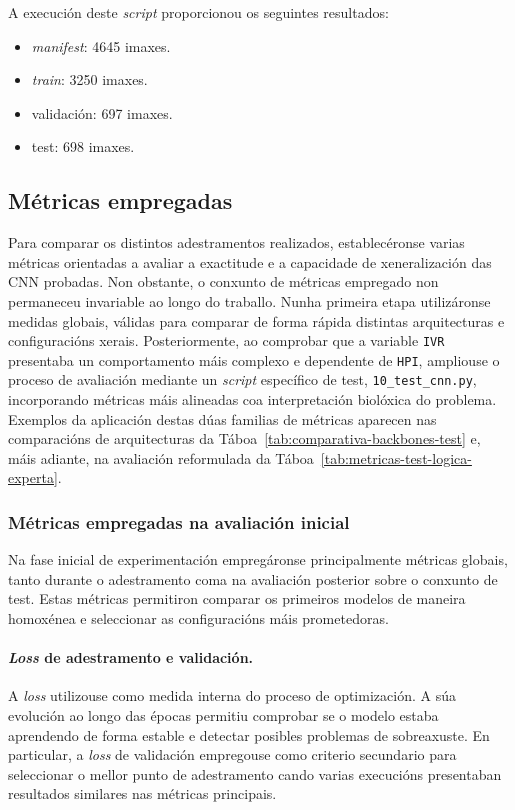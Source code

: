 A execución deste \textit{script} proporcionou os seguintes resultados:
\begin{itemize}
    \item \textit{manifest}: 4645 imaxes.
    \item \textit{train}: 3250 imaxes.
    \item validación: 697 imaxes.
    \item test: 698 imaxes.
\end{itemize}

\subsection{Métricas empregadas}
Para comparar os distintos adestramentos realizados, establecéronse varias métricas orientadas a
avaliar a exactitude e a capacidade de xeneralización das CNN probadas. Non obstante, o conxunto de
métricas empregado non permaneceu invariable ao longo do traballo. Nunha primeira etapa utilizáronse
medidas globais, válidas para comparar de forma rápida distintas arquitecturas e configuracións
xerais. Posteriormente, ao comprobar que a variable \texttt{IVR} presentaba un comportamento máis
complexo e dependente de \texttt{HPI}, ampliouse o proceso de avaliación mediante un
\textit{script} específico de test, \texttt{10\_test\_cnn.py}, incorporando métricas máis
alineadas coa interpretación biolóxica do problema. Exemplos da aplicación destas dúas familias de
métricas aparecen nas comparacións de arquitecturas da Táboa~\ref{tab:comparativa-backbones-test} e,
máis adiante, na avaliación reformulada da Táboa~\ref{tab:metricas-test-logica-experta}.

\subsubsection{Métricas empregadas na avaliación inicial}
Na fase inicial de experimentación empregáronse principalmente métricas globais, tanto durante o
adestramento coma na avaliación posterior sobre o conxunto de test. Estas métricas permitiron
comparar os primeiros modelos de maneira homoxénea e seleccionar as configuracións máis prometedoras.

\paragraph{\textit{Loss} de adestramento e validación.}
A \textit{loss} utilizouse como medida interna do proceso de optimización. A súa evolución ao longo
das épocas permitiu comprobar se o modelo estaba aprendendo de forma estable e detectar posibles
problemas de sobreaxuste. En particular, a \textit{loss} de validación empregouse como criterio
secundario para seleccionar o mellor punto de adestramento cando varias execucións presentaban
resultados similares nas métricas principais.

